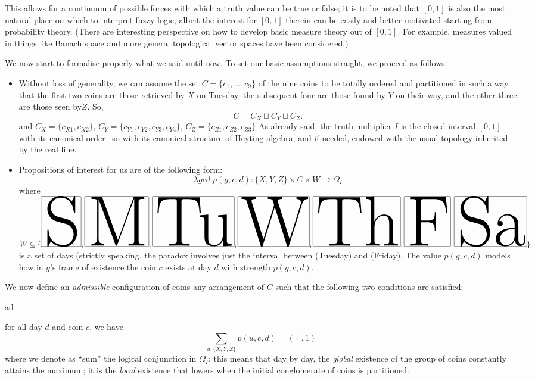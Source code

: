 \begin{example}
\begin{remark}
		This allows for a continuum of possible forces with which a truth value can be true or false;  it is to be noted that $[0,1]$ is also the most natural place on which to interpret fuzzy logic, albeit the interest for $[0,1]$ therein can be easily and better motivated starting from probability theory. (There are interesting perspective on how to develop basic measure theory out of $[0,1]$. For example, measures valued in things like Banach space and more general topological	vector spaces have been considered.)
	\end{remark}
	We now start to formalise properly what we said until now. To set our basic assumptions straight, we proceed as follows:
	\begin{itemize}
		\item Without loss of generality, we can assume the set $C = \{c_1,\dots,c_9\}$ of the nine coins to be totally ordered and partitioned in such a way that the first two coins are those retrieved by $X$ on Tuesday, the subsequent four are those found by $Y$ on their way, and the other three are those seen by$Z$. So,
		      \[C = C_X \sqcup C_Y \sqcup C_Z.\]
		      and $C_X = \{c_{X1}, c_{X2}\}$, $C_Y = \{c_{Y1},c_{Y2},c_{Y3},c_{Y4}\}$, $C_Z= \{c_{Z1}, c_{Z2}, c_{Z3}\}$ As already said, the truth multiplier $I$ is the closed interval $[0,1]$ with its canonical order --so with its canonical structure of Heyting algebra, and if needed, endowed with the usual topology inherited by the real line.
		\item Propositions of interest for us are of the following form:
		      \[\lambda gcd.p(g, c, d) : \{X,Y,Z\}\times C\times W \to \Omega_I\]
		      where $W \subseteq \{\S,\M,\Tu,\W, \Th,\F,\Sa\}$ is a set of days (strictly speaking, the paradox involves just the interval between \Tu (Tuesday) and \F (Friday). The value $p(g,c,d)$ models how in $g$'s frame of existence the coin $c$ exists at day $d$ with strength $p(g,c,d)$.
	\end{itemize}
	\begin{definition}
		We now define an \emph{admissible} configuration of coins any arrangement of $C$ such that the following two conditions are satisfied:
		\begin{enumtag}{ad}
			\item \label{ad:uno} for all day $d$ and coin $c$, we have
			\[
				\sum_{u: \{X,Y,Z\}} p(u,c,d) = (\top, 1)
			\]
			where we denote as ``sum'' the logical conjunction in $\Omega_I$: this means that day by day, the \emph{global} existence of the group of coins constantly attains the maximum; it is the \emph{local} existence that lowers when the initial conglomerate of coins is partitioned.

\end{enumtag}
\end{definition}
\end{example}
